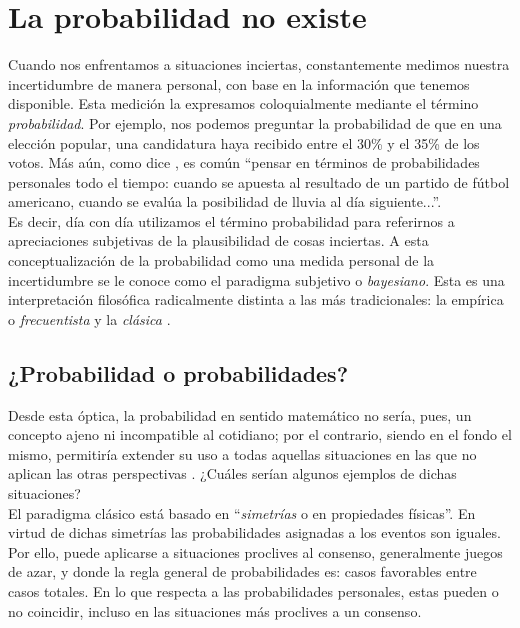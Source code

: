 \chapter{La probabilidad no existe}
	
Cuando nos enfrentamos a situaciones inciertas, constantemente medimos nuestra incertidumbre de manera personal, con base en la información que tenemos disponible. Esta medición la expresamos coloquialmente mediante el término \textit{probabilidad}. Por ejemplo, nos podemos preguntar la probabilidad de que en una elección popular, una candidatura haya recibido entre el 30\% y el 35\% de los votos. Más aún, como dice \textcite{Berger85}, es común ``pensar en términos de probabilidades personales todo el tiempo: cuando se apuesta al resultado de un partido de fútbol americano, cuando se evalúa la posibilidad de lluvia al día siguiente...''.\\ 

Es decir, día con día utilizamos el término probabilidad para referirnos a apreciaciones subjetivas de la plausibilidad de cosas inciertas. A esta conceptualización de la probabilidad como una medida personal de la incertidumbre se le conoce como el paradigma subjetivo o \textit{bayesiano}. Esta es una interpretación filosófica radicalmente distinta a las más tradicionales: la empírica o \textit{frecuentista} y la \textit{clásica} \parencite{Nozer17,GP16}. 
	
\section{¿Probabilidad o probabilidades?}

Desde esta óptica, la probabilidad en sentido matemático no sería, pues, un concepto ajeno ni incompatible al cotidiano; por el contrario, siendo en el fondo el mismo, permitiría extender su uso a todas aquellas situaciones en las que no aplican las otras perspectivas \parencite{Berger85,GP16}. ¿Cuáles serían algunos ejemplos de dichas situaciones?\\
	
El paradigma clásico está basado en ``\textit{simetrías} o en propiedades físicas''\parencite{GP16}. En virtud de dichas simetrías las probabilidades asignadas a los eventos son iguales. Por ello, puede aplicarse a situaciones proclives al consenso, generalmente juegos de azar, y donde la regla general de probabilidades es: casos favorables entre casos totales. En lo que respecta a las probabilidades personales, estas pueden o no coincidir, incluso en las situaciones más proclives a un consenso.\\ 
	
